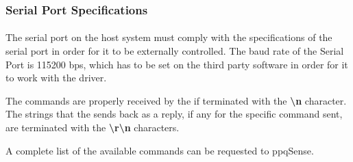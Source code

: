 
\subsubsection{\QubeModel  Serial Port Specifications}
\paragraph{} The serial port on the host system must comply with the specifications of the \QubeModel serial port in order for it to be externally controlled. \newline
The baud rate of the \QubeModel  Serial Port is 115200 bps, which has to be set on the third party software in order for it to work with the driver. \newline

The commands are properly received by the \QubeModel if terminated with the \textbf{\textbackslash n} character.
\newline The strings that the \QubeModel  sends back as a reply, if any for the specific command sent, are terminated with the \textbf{\textbackslash r\textbackslash n } characters. \newline

A complete list of the available commands can be requested to ppqSense.

\newpage